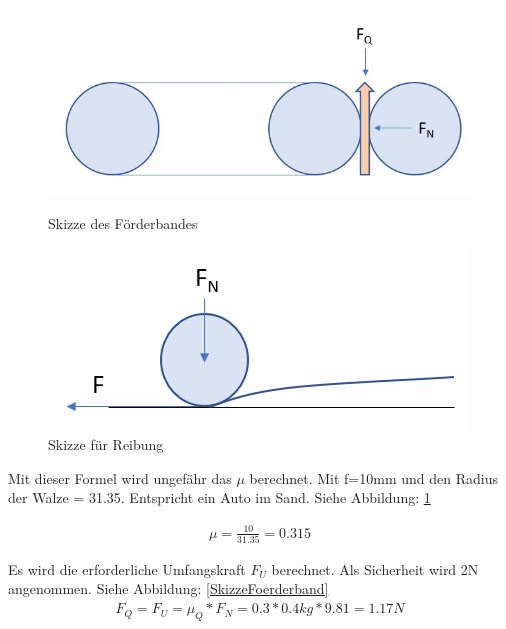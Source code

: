\begin{figure}[H]
   \begin{minipage}[hbt]{.4\linewidth} %
      \includegraphics[width=\linewidth]{Bilder/Powerpoint/Foerderband_Skizze}
      \caption{Skizze des Förderbandes}
      \label{SkizzeFoerderband} 
   \end{minipage}
   \hspace{.2\linewidth}%
   \begin{minipage}[hbt]{.4\linewidth} %
      \includegraphics[width=\linewidth]{Bilder/Powerpoint/Reibung}
      \caption{Skizze für Reibung}
      \label{SkizzeReibung}
   \end{minipage}
\end{figure}

Mit dieser Formel wird ungefähr das $\mu$ berechnet. Mit f=10mm und den Radius der Walze = 31.35. Entspricht ein Auto im Sand. Siehe Abbildung: \ref{SkizzeReibung}

\begin{align*}
\mu = \frac{10}{31.35} = 0.315
\end{align*}

Es wird die erforderliche Umfangskraft $F_U$ berechnet. Als Sicherheit wird 2N angenommen. Siehe Abbildung: \ref{SkizzeFoerderband}
\begin{align*}
F_Q= F_U=\mu_Q*F_N = 0.3*0.4kg*9.81 = 1.17N
\end{align*}

